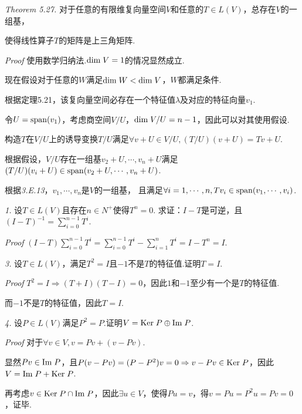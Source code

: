 \textit{Theorem 5.27.}
对于任意的有限维复向量空间\(V\)和任意的\(T \in L(V)\)，总存在\(V\)的一组基，

使得线性算子\(T\)的矩阵是上三角矩阵.

\textit{Proof}
使用数学归纳法.\(\mathrm{dim \;} V=1\)的情况显然成立.

现在假设对于任意的\(W\)满足\(\mathrm{dim \;} W<\mathrm{dim \;} V\)，\(W\)都满足条件.

根据定理5.21，该复向量空间必存在一个特征值\(\lambda\)及对应的特征向量\(v_1\).

令\(U=\mathrm{span}(v_1)\)，考虑商空间\(V/U\)，\(\mathrm{dim \;} V/U=n-1\)，因此可以对其使用假设.

构造\(T\)在\(V/U\)上的诱导变换\(T/U\)满足\(\forall v+U \in V/U,(T/U)(v+U)=Tv+U\).

根据假设，\(V/U\)存在一组基\(v_2+U,\cdots,v_n+U\)满足\((T/U)(v_i+U) \in \mathrm{span}(v_2+U,\cdots,v_n+U)\).

根据\textit{3.E.13}，\(v_1,\cdots,v_n\)是\(V\)的一组基，
且满足\(\forall i=1,\cdots,n,Tv_i \in \mathrm{span}(v_1,\cdots,v_i)\).

\hspace*{\fill}

\textit{1.}
设\(T \in L(V)\)且存在\(n \in N^+\)使得\(T^n=0\).
求证：\(I-T\)是可逆，且\((I-T)^{-1}=\sum_{i=0}^{n-1} T^i\).

\textit{Proof}
\((I-T)\sum_{i=0}^{n-1} T^i=\sum_{i=0}^{n-1} T^i-\sum_{i=1}^n T^i=I-T^n=I\).

\hspace*{\fill}

\textit{3.}
设\(T \in L(V)\)，满足\(T^2=I\)且\(-1\)不是\(T\)的特征值.证明\(T=I\).

\textit{Proof}
\(T^2=I \Rightarrow (T+I)(T-I)=0\)，因此\(1\)和\(-1\)至少有一个是\(T\)的特征值.

而\(-1\)不是\(T\)的特征值，因此\(T=I\).

\hspace*{\fill}

\textit{4.}
设\(P \in L(V)\)满足\(P^2=P\).证明\(V=\mathrm{Ker \;} P \oplus \mathrm{Im \;} P\).

\textit{Proof}
对于\(\forall v \in V,v=Pv+(v-Pv)\).

显然\(Pv \in \mathrm{Im \;} P\)，且\(P(v-Pv)=(P-P^2)v=0 \Rightarrow v-Pv \in \mathrm{Ker \;} P\)，因此\(V=\mathrm{Im \;} P+\mathrm{Ker \;} P\).

再考虑\(v \in \mathrm{Ker \;} P \cap \mathrm{Im \;} P\)，因此\(\exists u \in V\)，使得\(Pu=v\)，得\(v=Pu=P^2u=Pv=0\)，证毕.

\hspace*{\fill}

